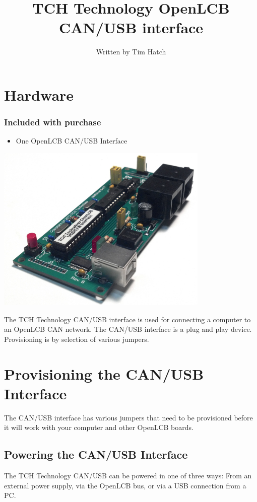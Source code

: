 \documentclass[15pt]{book}
\title{TCH Technology OpenLCB CAN/USB interface}
\author{Written by Tim Hatch}
\begin{document}
\maketitle

\tableofcontents

\chapter{Hardware}
\subsection{Included with purchase}
\begin{itemize}
\item One OpenLCB CAN/USB Interface
\end{itemize}
\includegraphics[width=4in]{images/usb_can_a.png}


The TCH Technology CAN/USB interface is used for connecting a computer to an OpenLCB CAN network. The  CAN/USB interface is a plug and play device.  Provisioning is by selection of various jumpers.

\chapter{Provisioning the CAN/USB Interface}

The CAN/USB interface has various jumpers that need to be provisioned before it will work with your computer and other OpenLCB boards.

\section{Powering the CAN/USB Interface}
The TCH Technology CAN/USB can be powered in one of three ways: From an external power supply, via the OpenLCB bus, or via a USB connection from a PC.
\end{document}
